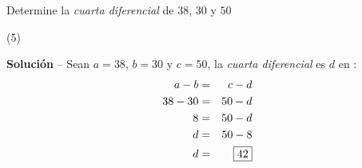 \item{Determine la \textit{cuarta diferencial} de $38$, $30$ y $50$
	\begin{tasks}(5)
	\end{tasks}
	\noindent \textbf{Solución} -- {\small Sean $a = 38$, $b = 30$ y $c = 50$, la \textit{cuarta diferencial} es $d$ en} :
	\begin{eqnarray*}
		a - b &=& c - d \\
		38 - 30 &=& 50 - d \\
		8 &=& 50 - d \\
		d &=& 50 - 8 \\
		d &=& \fbox{42}
	\end{eqnarray*}
}
